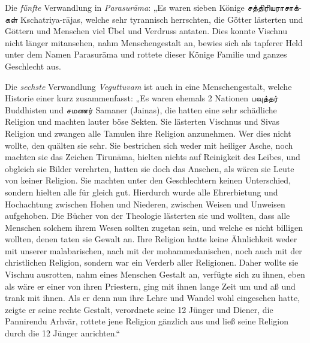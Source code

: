 \documentclass{article}
\newcommand{\TamilText}[1]{\texttamil{#1}}
\newcommand{\tam}[1]{\TamilText{#1}}
\begin{document}
Die \emph{fünfte} Verwandlung in \emph{Parasur\={a}ma}: „Es waren sieben Könige \tam{சத்திரியராசாக்கள்} Kschatriya-r\={a}jas, welche sehr tyrannisch herrschten, die Götter lästerten und Göttern und Menschen viel Übel und Verdruss antaten. Dies konnte Vischnu nicht länger mitansehen, nahm Menschengestalt an, bewies sich als tapferer Held unter dem Namen Parasur\={a}ma und rottete dieser Könige Familie und ganzes Geschlecht aus.

Die \emph{sechste} Verwandlung \emph{Veguttuvam} ist auch in eine Menschengestalt, welche Historie einer kurz zusammenfasst: „Es waren ehemals 2 Nationen \tam{பவுத்தர்} Buddhisten und \tam{சமணர்} Samaner (Jainas), die hatten eine sehr schädliche Religion und machten lauter böse Sekten. Sie lästerten Vischnus und Sivas Religion und zwangen alle Tamulen ihre Religion anzunehmen. Wer dies nicht wollte, den quälten sie sehr. Sie bestrichen sich weder mit heiliger Asche, noch machten sie das Zeichen Tirun\={a}ma, hielten nichts auf Reinigkeit des Leibes, und obgleich sie Bilder verehrten, hatten sie doch das Ansehen, als wären sie Leute von keiner Religion. Sie machten unter den Geschlechtern keinen Unterschied, sondern hielten alle für gleich gut. Hierdurch wurde alle Ehrerbietung und Hochachtung zwischen Hohen und Niederen, zwischen Weisen und Unweisen aufgehoben. Die Bücher von der Theologie lästerten sie und wollten, dass alle Menschen solchem ihrem Wesen sollten zugetan sein, und welche es nicht billigen wollten, denen taten sie Gewalt an. Ihre Religion hatte keine Ähnlichkeit weder mit unserer malabarischen, nach mit der mohammedanischen, noch auch mit der christlichen Religion, sondern war ein Verderb aller Religionen. Daher wollte sie Vischnu ausrotten, nahm eines Menschen Gestalt an, verfügte sich zu ihnen, eben als wäre er einer von ihren Priestern, ging mit ihnen lange Zeit um und aß und trank mit ihnen. Als er denn nun ihre Lehre und Wandel wohl eingesehen hatte, zeigte er seine rechte Gestalt, verordnete seine 12 Jünger und Diener, die Pannirendu Arhv\={a}r, rottete jene Religion gänzlich aus und ließ seine Religion durch die 12 Jünger anrichten.“
\end{document}
